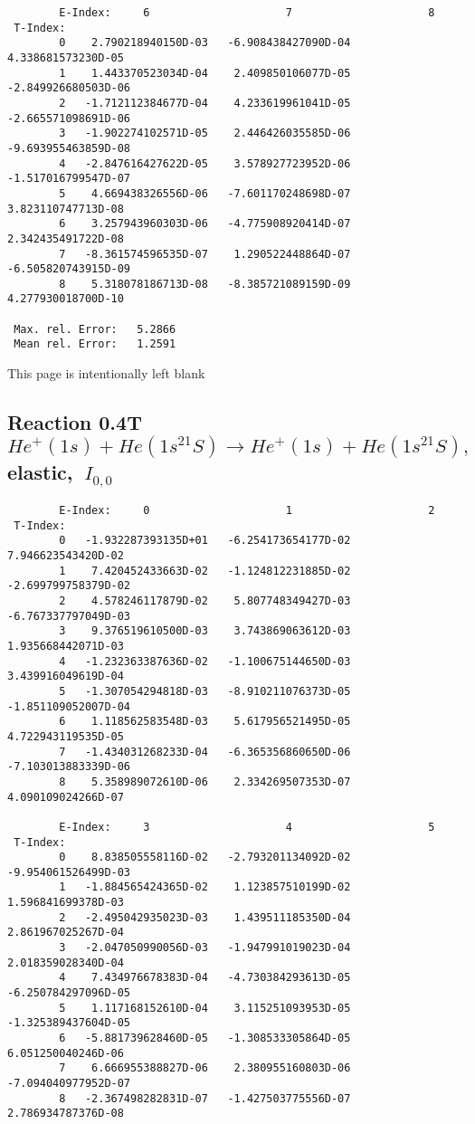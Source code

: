 \documentclass[12pt,dvipdfmx]{article}
\begin{document}
{\begin{small}
\begin{verbatim}
        E-Index:     6                     7                     8
 T-Index:
        0    2.790218940150D-03   -6.908438427090D-04    4.338681573230D-05
        1    1.443370523034D-04    2.409850106077D-05   -2.849926680503D-06
        2   -1.712112384677D-04    4.233619961041D-05   -2.665571098691D-06
        3   -1.902274102571D-05    2.446426035585D-06   -9.693955463859D-08
        4   -2.847616427622D-05    3.578927723952D-06   -1.517016799547D-07
        5    4.669438326556D-06   -7.601170248698D-07    3.823110747713D-08
        6    3.257943960303D-06   -4.775908920414D-07    2.342435491722D-08
        7   -8.361574596535D-07    1.290522448864D-07   -6.505820743915D-09
        8    5.318078186713D-08   -8.385721089159D-09    4.277930018700D-10

 Max. rel. Error:   5.2866
 Mean rel. Error:   1.2591
\end{verbatim}\end{small}

\newpage
This page is intentionally left blank
\newpage


\subsection{
Reaction 0.4T  $He^+(1s) + He(1s^21S) \rightarrow He^+(1s) + He(1s^21S) ,\ $
 elastic, $\  I_{0,0}$
}

\begin{small}\begin{verbatim}
        E-Index:     0                     1                     2
 T-Index:
        0   -1.932287393135D+01   -6.254173654177D-02    7.946623543420D-02
        1    7.420452433663D-02   -1.124812231885D-02   -2.699799758379D-02
        2    4.578246117879D-02    5.807748349427D-03   -6.767337797049D-03
        3    9.376519610500D-03    3.743869063612D-03    1.935668442071D-03
        4   -1.232363387636D-02   -1.100675144650D-03    3.439916049619D-04
        5   -1.307054294818D-03   -8.910211076373D-05   -1.851109052007D-04
        6    1.118562583548D-03    5.617956521495D-05    4.722943119535D-05
        7   -1.434031268233D-04   -6.365356860650D-06   -7.103013883339D-06
        8    5.358989072610D-06    2.334269507353D-07    4.090109024266D-07

        E-Index:     3                     4                     5
 T-Index:
        0    8.838505558116D-02   -2.793201134092D-02   -9.954061526499D-03
        1   -1.884565424365D-02    1.123857510199D-02    1.596841699378D-03
        2   -2.495042935023D-03    1.439511185350D-04    2.861967025267D-04
        3   -2.047050990056D-03   -1.947991019023D-04    2.018359028340D-04
        4    7.434976678383D-04   -4.730384293613D-05   -6.250784297096D-05
        5    1.117168152610D-04    3.115251093953D-05   -1.325389437604D-05
        6   -5.881739628460D-05   -1.308533305864D-05    6.051250040246D-06
        7    6.666955388827D-06    2.380955160803D-06   -7.094040977952D-07
        8   -2.367498282831D-07   -1.427503775556D-07    2.786934787376D-08


\end{verbatim}
\end{small}}
\end{document}
